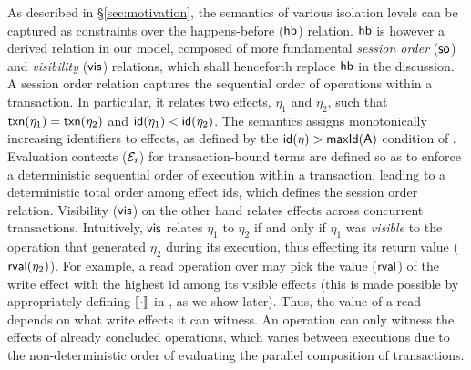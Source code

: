 As described in \S\ref{sec:motivation}, the semantics of various
isolation levels can be captured as constraints over the
happens-before ($\textsf{hb}$) relation. $\textsf{hb}$ is however a derived relation
in our model, composed of more fundamental \emph{session order}
($\textsf{so}$) and \emph{visibility} ($\textsf{vis}$) relations, which shall
henceforth replace $\textsf{hb}$ in the discussion.  A session order relation
captures the sequential order of operations within a transaction. In
particular, it relates two effects, $\eta_1$ and $\eta_2$, such that
$\textsf{txn}(\eta_1) = \textsf{txn}(\eta_2)$ and $\textsf{id}(\eta_1) < \textsf{id}(\eta_2)$.  The
semantics assigns monotonically increasing identifiers to effects, as
defined by the $\textsf{id}(\eta) > \textsf{maxId}(\textsf{A})$ condition of
.  Evaluation contexts ($\mathcal{E}_i$) for
transaction-bound terms are defined so as to enforce a deterministic
sequential order of execution within a transaction, leading to a
deterministic total order among effect ids, which defines the session
order relation. Visibility ($\textsf{vis}$) on the other hand relates effects
across concurrent transactions.  Intuitively, $\textsf{vis}$ relates $\eta_1$
to $\eta_2$ if and only if $\eta_1$ was \emph{visible} to the
operation that generated $\eta_2$ during its execution, thus effecting
its return value ($\textsf{rval}(\eta_2)$). For example, a read operation over
 may pick the value ($\textsf{rval}$) of the write effect with the highest id
among its visible effects (this is made possible by appropriately
defining $\llbracket \cdot \rrbracket$ in , as we show later).
Thus, the value of a read depends on what write effects it can
witness. An operation can only witness the effects of already
concluded operations, which varies between executions due to the
non-deterministic order of evaluating the parallel composition of
transactions.

